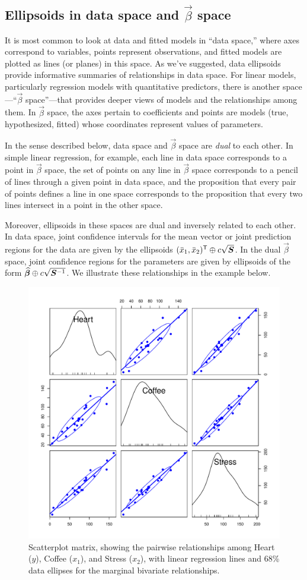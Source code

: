 \subsection[Ellipsoids in data space and beta space]{Ellipsoids in data space and $\vec{\beta}$ space}\label{sec:betaspace}

It is most common to look at data and fitted models in ``data space,'' where axes correspond to
variables, points represent observations, and fitted models are plotted as lines (or planes) in this space.
As we've suggested, data ellipsoids provide informative summaries of relationships in data space.
For linear models, particularly regression models with quantitative predictors, there is another space---``$\vec{\beta}$ space''---that provides deeper views of models and the relationships among them.
In $\vec{\beta}$ space, the axes pertain to coefficients and points are models (true, hypothesized, fitted) whose coordinates
represent values of parameters.

In the sense described below, data space and $\vec{\beta}$ space are \emph{dual} to each other.
In simple linear regression, for example, each line in data space corresponds to a point in $\vec{\beta}$ space,
the set of points on any line in $\vec{\beta}$ space corresponds to a pencil of lines through a given point
in data space, and the proposition that every pair of points defines a line in one space corresponds to
the proposition that every two lines intersect in a point in the other space.

Moreover, ellipsoids in these spaces are dual and inversely related to each other.
In data space, joint confidence intervals for the mean vector or joint prediction
regions for the data are given by the ellipsoids $(\bar{x}_1, \bar{x}_2)^\mathsf{T} \oplus c \sqrt{\bm{S}}$.
In the dual $\vec{\beta}$ space, joint confidence regions for the parameters
are given by ellipsoids of the form $\widehat{\bm{\beta}} \oplus c \sqrt{\bm{S}^{-1}}$.
We illustrate these relationships in the example below.

\begin{figure}[htb]
  \centering
  \includegraphics[width=.6\textwidth,clip]{fig/vis-reg-coffee11}
  \caption{Scatterplot matrix, showing the pairwise relationships among Heart ($y$), Coffee ($x_1$), and Stress ($x_2$),
  with linear regression lines and 68\% data ellipses for the marginal bivariate relationships.
  }%
  \label{fig:vis-reg-coffee11}
\end{figure}

